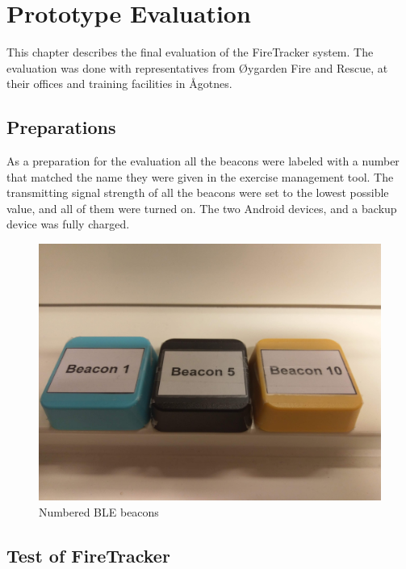 \documentclass[../Main/thesis.tex]{subfiles}
\begin{document}
\chapter{Prototype Evaluation}
\label{ch:evaluation}
This chapter describes the final evaluation of the FireTracker system.
The evaluation was done with representatives from Øygarden Fire and Rescue, at their offices and training facilities in Ågotnes.

\section{Preparations}
As a preparation for the evaluation all the beacons were labeled with a number that matched the name they were given in the exercise management tool. 
The transmitting signal strength of all the beacons were set to the lowest possible value, and all of them were turned on.
The two Android devices, and a backup device was fully charged.

\begin{figure}[h]
	\centering
	\includegraphics[width=\textwidth]{../fig/beacons}
	\caption{Numbered BLE beacons}
	\label{fig:beacons}
\end{figure}
\section{Test of FireTracker}
\end{document}
